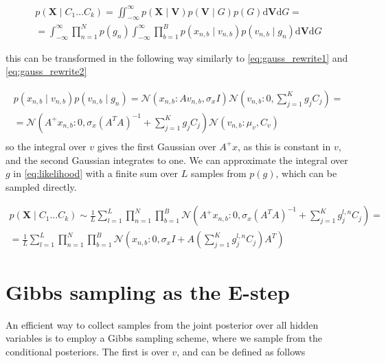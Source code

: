 \documentclass{paper}
\begin{document}
\begin{equation} \label{eq:likelihood}
\begin{split}
p(\mathbf{X} \mid C_1 \dots C_k) = \iint_{-\infty}^{\infty} p(\mathbf{X} \mid \mathbf{V}) p(\mathbf{V} \mid G) p(G) \mathrm{d}\mathbf{V}\mathrm{d}G =\\
= \int_{-\infty}^{\infty} \prod_{n=1}^N p(g_n) \int_{-\infty}^{\infty} \prod_{b=1}^B p(x_{n,b} \mid v_{n,b}) p(v_{n,b} \mid g_n) \mathrm{d}\mathbf{V}\mathrm{d}G
\end{split}
\end{equation}

this can be transformed in the following way similarly to \ref{eq:gauss_rewrite1} and \ref{eq:gauss_rewrite2}

\begin{equation}
\begin{split}
p(x_{n,b} \mid v_{n,b}) p(v_{n,b} \mid g_n) = \mathcal{N}(x_{n,b}:Av_{n,b},\sigma_x I) \mathcal{N}(v_{n,b}:0,\sum_{j=1}^K g_jC_j) = \\
= \mathcal{N}(A^{+}x_{n,b}:0,\sigma_x(A^TA)^{-1} + \sum_{j=1}^K g_jC_j) \mathcal{N}(v_{n,b}:\mu_v,C_v)\\
\end{split}
\end{equation}
%
so the integral over $v$ gives the first Gaussian over $A^{+}x$, as this is constant in $v$, and the second Gaussian integrates to one. We can approximate the integral over $g$ in \ref{eq:likelihood} with a finite sum over $L$ samples from $p(g)$, which can be sampled directly. 

\begin{equation}
\begin{split}
p(\mathbf{X} \mid C_1 \dots C_k) \sim \frac{1}{L} \sum_{l=1}^L \prod_{n=1}^N \prod_{b=1}^B \mathcal{N}(A^{+}x_{n,b}:0,\sigma_x(A^TA)^{-1} + \sum_{j=1}^K g_j^{l,n} C_j) = \\
= \frac{1}{L} \sum_{l=1}^L \prod_{n=1}^N \prod_{b=1}^B \mathcal{N} \left( x_{n,b}:0,\sigma_x I + A \left( \sum_{j=1}^K g_j^{l,n} C_j \right) A^T \right) 
\end{split}
\end{equation}

\section{Gibbs sampling as the E-step}

An efficient way to collect samples from the joint posterior over all hidden variables is to employ a Gibbs sampling scheme, where we sample from the conditional posteriors. The first is over $v$, and can be defined as follows
\end{document}
